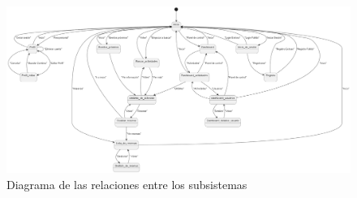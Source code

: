 \begin{figure}[H]
	\centering
	\includegraphics[width=1\linewidth]{5-AnalisisDelSistemaDeInformacion/Navegabilidad/diagrama.png}
	\caption{Diagrama de las relaciones entre los subsistemas}
	\label{fig:diagrama}
\end{figure}
